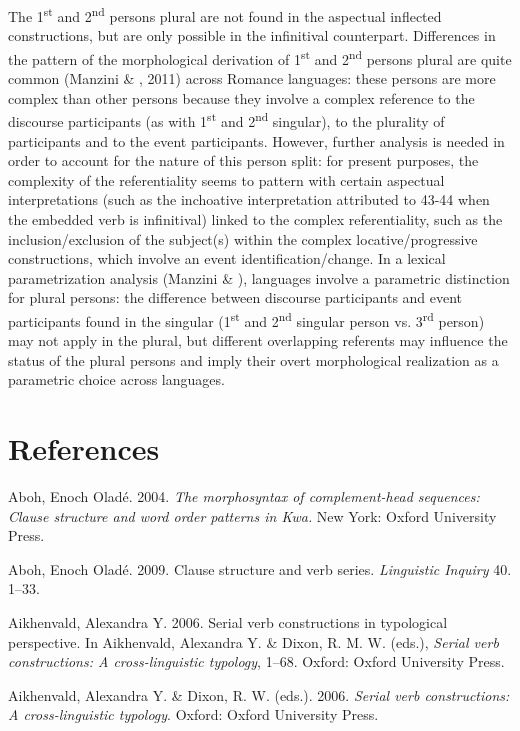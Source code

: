 \documentclass[output=paper]{langsci/langscibook}
\begin{document}
The 1\textsuperscript{st} and 2\textsuperscript{nd} persons plural are not found in the aspectual inflected constructions, but are only possible in the infinitival counterpart. Differences in the pattern of the morphological derivation of 1\textsuperscript{st} and 2\textsuperscript{nd} persons plural are quite common (Manzini \& \citealt{Savoia2005}, 2011) across Romance languages: these persons are more complex than other persons \citep{Bobalijk2008} because they involve a complex reference to the discourse participants (as with 1\textsuperscript{st} and 2\textsuperscript{nd} singular), to the plurality of participants and to the event participants. However, further analysis is needed in order to account for the nature of this person split: for present purposes, the complexity of the referentiality seems to pattern with certain aspectual interpretations (such as the inchoative interpretation attributed to 43-44 when the embedded verb is infinitival) linked to the complex referentiality, such as the inclusion/exclusion of the subject(s) within the complex locative/progressive constructions, which involve an event identification/change. In a lexical parametrization analysis (Manzini \& \citealt{Savoia2011}), languages involve a parametric distinction for plural persons: the difference between discourse participants and event participants found in the singular (1\textsuperscript{st} and 2\textsuperscript{nd} singular person vs. 3\textsuperscript{rd} person) may not apply in the plural, but different overlapping referents may influence the status of the plural persons and imply their overt morphological realization as a parametric choice across languages.

\section{ References}

Aboh, Enoch Oladé. 2004. \textit{The morphosyntax of complement-head sequences: Clause structure and word order patterns in Kwa.} New York: Oxford University Press.

Aboh, Enoch Oladé. 2009. Clause structure and verb series. \textit{Linguistic Inquiry} 40. 1–33.

Aikhenvald, Alexandra Y. 2006. Serial verb constructions in typological perspective. In Aikhenvald, Alexandra Y. \& Dixon, R. M. W. (eds.), \textit{Serial verb constructions: A cross-linguistic typology}, 1–68. Oxford: Oxford University Press.

Aikhenvald, Alexandra Y. \& Dixon, R. W. (eds.). 2006. \textit{Serial verb constructions: A cross-linguistic typology}. Oxford: Oxford University Press.
\end{document}
